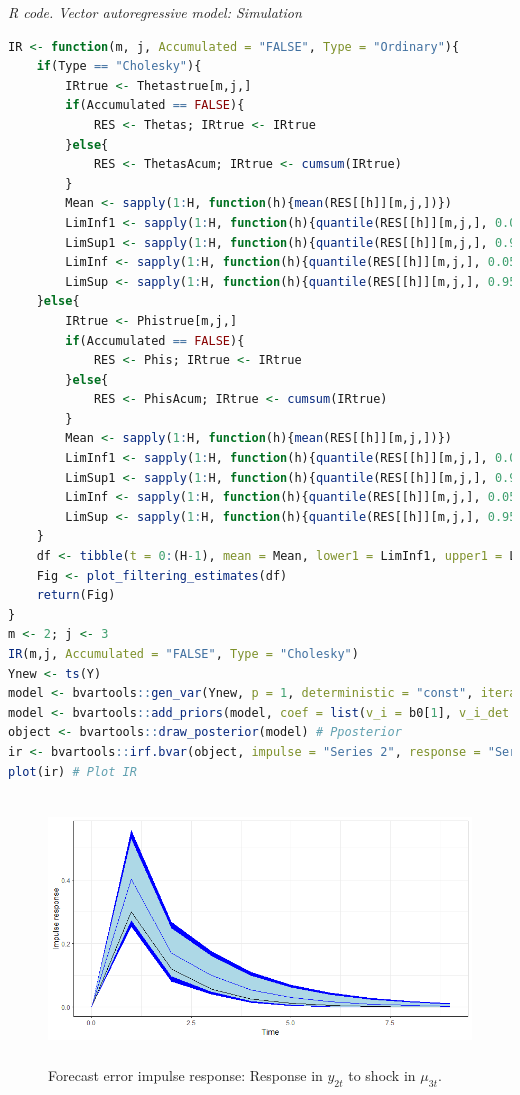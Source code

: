 \begin{enumerate}[leftmargin=*]
\begin{tcolorbox}[enhanced,width=4.67in,center upper,
	fontupper=\large\bfseries,drop shadow southwest,sharp corners]
	\textit{R code. Vector autoregressive model: Simulation}
	\begin{VF}
		\begin{lstlisting}[language=R]
IR <- function(m, j, Accumulated = "FALSE", Type = "Ordinary"){
	if(Type == "Cholesky"){
		IRtrue <- Thetastrue[m,j,]
		if(Accumulated == FALSE){
			RES <- Thetas; IRtrue <- IRtrue
		}else{
			RES <- ThetasAcum; IRtrue <- cumsum(IRtrue)
		}
		Mean <- sapply(1:H, function(h){mean(RES[[h]][m,j,])})
		LimInf1 <- sapply(1:H, function(h){quantile(RES[[h]][m,j,], 0.025)})
		LimSup1 <- sapply(1:H, function(h){quantile(RES[[h]][m,j,], 0.975)})
		LimInf <- sapply(1:H, function(h){quantile(RES[[h]][m,j,], 0.05)})
		LimSup <- sapply(1:H, function(h){quantile(RES[[h]][m,j,], 0.95)})
	}else{
		IRtrue <- Phistrue[m,j,]
		if(Accumulated == FALSE){
			RES <- Phis; IRtrue <- IRtrue
		}else{
			RES <- PhisAcum; IRtrue <- cumsum(IRtrue)
		}
		Mean <- sapply(1:H, function(h){mean(RES[[h]][m,j,])})
		LimInf1 <- sapply(1:H, function(h){quantile(RES[[h]][m,j,], 0.025)})
		LimSup1 <- sapply(1:H, function(h){quantile(RES[[h]][m,j,], 0.975)})
		LimInf <- sapply(1:H, function(h){quantile(RES[[h]][m,j,], 0.05)})
		LimSup <- sapply(1:H, function(h){quantile(RES[[h]][m,j,], 0.95)})
	}
	df <- tibble(t = 0:(H-1), mean = Mean, lower1 = LimInf1, upper1 = LimSup1, lower = LimInf, upper = LimSup, x_true = IRtrue)
	Fig <- plot_filtering_estimates(df)
	return(Fig)
}
m <- 2; j <- 3
IR(m,j, Accumulated = "FALSE", Type = "Cholesky")
Ynew <- ts(Y)
model <- bvartools::gen_var(Ynew, p = 1, deterministic = "const", iterations = MCMC, burnin = burnin) # Model
model <- bvartools::add_priors(model, coef = list(v_i = b0[1], v_i_det = b0[1]), sigma = list(df = a0, scale = V[1,1]/a0)) # Prior
object <- bvartools::draw_posterior(model) # Pposterior
ir <- bvartools::irf.bvar(object, impulse = "Series 2", response = "Series 3") # Calculate IR
plot(ir) # Plot IR
\end{lstlisting}
	\end{VF}
\end{tcolorbox} 


\begin{figure}[!h]
	\includegraphics[width=340pt, height=200pt]{Chapters/chapter8/figures/IR23}
	\caption[List of figure caption goes here]{Forecast error impulse response: Response in $y_{2t}$ to shock in $\mu_{3t}$.}\label{fig7}
\end{figure}


\end{enumerate}